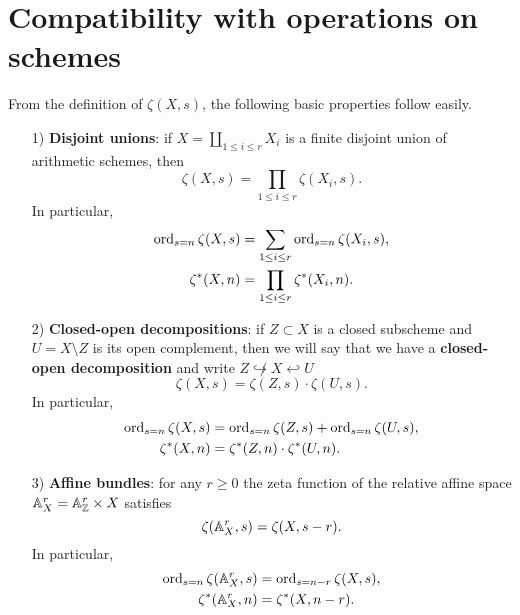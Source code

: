 \documentclass{article}
\numberwithin{equation}{section}
\begin{document}

\section{Compatibility with operations on schemes}
\label{sec:compatibility-with-operations}

From the definition of $\zeta (X,s)$, the following basic properties follow
easily.

\begin{enumerate}
\item[1)] \textbf{Disjoint unions}: if $X = \coprod_{1 \le i \le r} X_i$ is a
  finite disjoint union of arithmetic schemes, then
  \begin{equation}
    \label{eqn:zeta-function-for-disjoint-unions}
    \zeta (X,s) = \prod_{1 \le i \le r} \zeta (X_i,s).
  \end{equation}
  In particular,
  \begin{align*}
    \operatorname{ord}_{s=n} \zeta (X,s) & = \sum_{1 \le i \le r} \operatorname{ord}_{s=n} \zeta (X_i,s), \\
    \zeta^* (X,n) & = \prod_{1 \le i \le r} \zeta^* (X_i,n).
  \end{align*}

\item[2)] \textbf{Closed-open decompositions}: if $Z \subset X$ is a closed
  subscheme and $U = X\setminus Z$ is its open complement, then we will say that
  we have a \textbf{closed-open decomposition} and write
  $Z \not\hookrightarrow X \hookleftarrow U$
  \begin{equation}
    \label{eqn:zeta-function-for-closed-open-decompositions}
    \zeta (X,s) = \zeta (Z,s) \cdot \zeta (U,s).
  \end{equation}
  In particular,
  \begin{align*}
    \operatorname{ord}_{s=n} \zeta (X,s) & = \operatorname{ord}_{s=n} \zeta (Z,s) + \operatorname{ord}_{s=n} \zeta (U,s), \\
    \zeta^* (X,n) & = \zeta^* (Z,n) \cdot \zeta^* (U,n).
  \end{align*}

\item[3)] \textbf{Affine bundles}: for any $r \ge 0$ the zeta function of the
  relative affine space $\mathbb{A}^r_X = \mathbb{A}^r_{\mathbb{Z}} \times X$ satisfies
  \begin{equation}
    \label{eqn:zeta-function-for-affine-space}
    \zeta (\AA^r_X, s) = \zeta (X, s-r).
  \end{equation}
  In particular,
  \begin{align*}
    \operatorname{ord}_{s=n} \zeta (\mathbb{A}^r_X, s) & = \operatorname{ord}_{s=n-r} \zeta (X, s), \\
    \zeta^* (\mathbb{A}^r_X, n) & = \zeta^* (X, n-r).
  \end{align*}
\end{enumerate}
\end{document}
